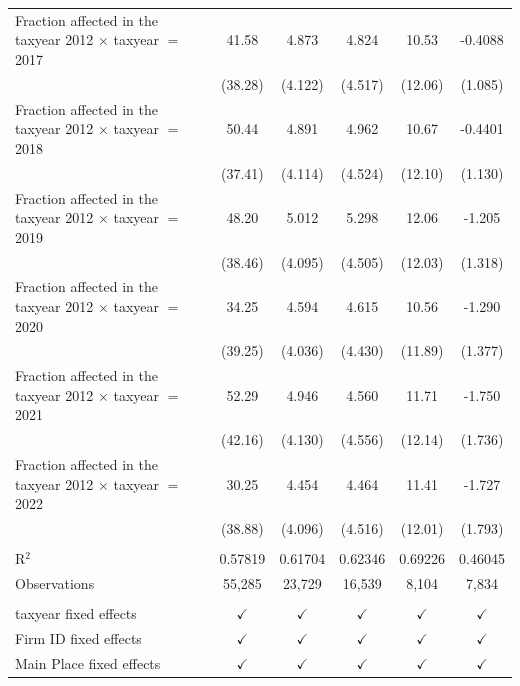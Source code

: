 \begin{tabular}{lccccc}
   Fraction affected in the taxyear 2012 $\times$ taxyear $=$ 2017  & 41.58         & 4.873         & 4.824         & 10.53         & -0.4088\\   
                                                                    & (38.28)       & (4.122)       & (4.517)       & (12.06)       & (1.085)\\   
   Fraction affected in the taxyear 2012 $\times$ taxyear $=$ 2018  & 50.44         & 4.891         & 4.962         & 10.67         & -0.4401\\   
                                                                    & (37.41)       & (4.114)       & (4.524)       & (12.10)       & (1.130)\\   
   Fraction affected in the taxyear 2012 $\times$ taxyear $=$ 2019  & 48.20         & 5.012         & 5.298         & 12.06         & -1.205\\   
                                                                    & (38.46)       & (4.095)       & (4.505)       & (12.03)       & (1.318)\\   
   Fraction affected in the taxyear 2012 $\times$ taxyear $=$ 2020  & 34.25         & 4.594         & 4.615         & 10.56         & -1.290\\   
                                                                    & (39.25)       & (4.036)       & (4.430)       & (11.89)       & (1.377)\\   
   Fraction affected in the taxyear 2012 $\times$ taxyear $=$ 2021  & 52.29         & 4.946         & 4.560         & 11.71         & -1.750\\   
                                                                    & (42.16)       & (4.130)       & (4.556)       & (12.14)       & (1.736)\\   
   Fraction affected in the taxyear 2012 $\times$ taxyear $=$ 2022  & 30.25         & 4.454         & 4.464         & 11.41         & -1.727\\   
                                                                    & (38.88)       & (4.096)       & (4.516)       & (12.01)       & (1.793)\\   
    \\
   R$^2$                                                            & 0.57819       & 0.61704       & 0.62346       & 0.69226       & 0.46045\\  
   Observations                                                     & 55,285        & 23,729        & 16,539        & 8,104         & 7,834\\  
    \\
   taxyear fixed effects                                            & $\checkmark$  & $\checkmark$  & $\checkmark$  & $\checkmark$  & $\checkmark$\\   
   Firm ID fixed effects                                            & $\checkmark$  & $\checkmark$  & $\checkmark$  & $\checkmark$  & $\checkmark$\\   
   Main Place fixed effects                                         & $\checkmark$  & $\checkmark$  & $\checkmark$  & $\checkmark$  & $\checkmark$\\   
   \bottomrule
\end{tabular}
\par\endgroup
